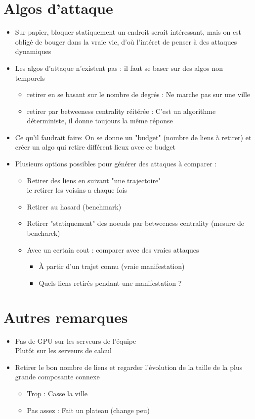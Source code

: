 \documentclass{article}
\begin{document}
\section*{Algos d'attaque}
\begin{itemize}
	\item Sur papier, bloquer statiquement un endroit serait intéressant, mais on est obligé de bouger dans la vraie vie, d'où l'intéret de penser à des attaques dynamiques
	\item Les algos d'attaque n'existent pas : il faut se baser sur des algos non temporels %
	\begin{itemize}
		\item retirer en se basant sur le nombre de degrés : Ne marche pas sur une ville
		\item retirer par betweeness centrality réitérée : C'est un algorithme déterministe, il donne toujours la même réponse
	\end{itemize}
	\item Ce qu'il faudrait faire: On se donne un "budget" (nombre de liens à retirer) et créer un algo qui retire différent lieux avec ce budget
	\item Plusieurs options possibles pour générer des attaques à comparer  :
	\begin{itemize}
		\item Retirer des liens en suivant "une trajectoire" \\
	  	ie retirer les voisins a chaque fois
	  	\item Retirer au hasard (benchmark)
	  	\item Retirer "statiquement" des noeuds par betweeness centrality (mesure de bencharck)
	  	\item Avec un certain cout : comparer avec des vraies attaques 
	  	\begin{itemize}
	  		\item À partir d'un trajet connu (vraie manifestation)
	  		\item Quels liens retirés pendant une manifestation ?  
	  	\end{itemize}
	\end{itemize}
\end{itemize}

\section*{Autres remarques}
\begin{itemize}
	\item Pas de GPU sur les serveurs de l'équipe \\
	Plutôt sur les serveurs de calcul
	\item Retirer le bon nombre de liens et regarder l'évolution de la taille de la plus grande composante connexe
	\begin{itemize}
		\item Trop : Casse la ville
		\item Pas assez : Fait un plateau (change peu)
	\end{itemize}
\end{itemize}
\end{document}
